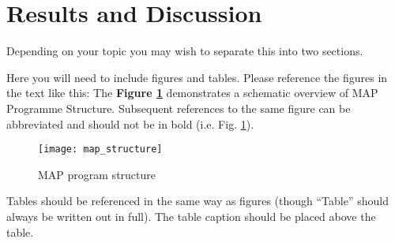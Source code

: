 \section{Results and Discussion}
Depending on your topic you may wish to separate this into two sections.

Here you will need to include figures and tables. Please reference the figures in the text like this: The \textbf{Figure \ref{map_struct}} demonstrates a schematic overview of MAP Programme Structure. Subsequent references to the same figure can be abbreviated and should not be in bold (i.e. Fig. \ref{map_struct}).

\begin{figure}
	\centering
	\texttt{[image: map\_structure]}
	\caption{MAP program structure\cite{map_web}}
	\label{map_struct}
\end{figure}

Tables should be referenced in the same way as figures (though “Table” should always be written out in full). The table caption should be placed above the table.
 